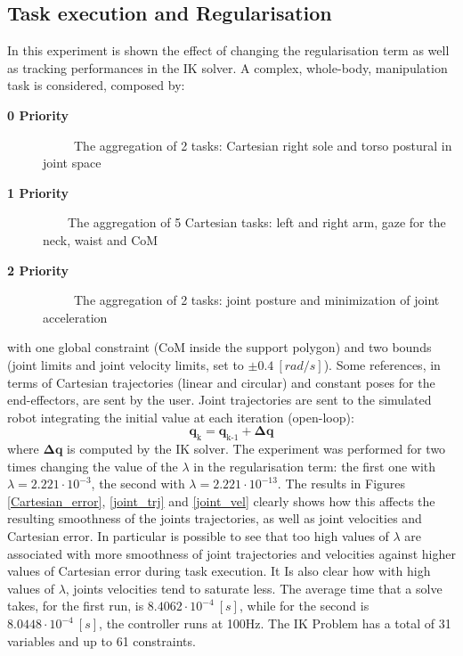 \subsection{Task execution and Regularisation}
In this experiment is shown the effect of changing the regularisation term as well as tracking performances in the IK solver. A complex, whole-body, manipulation task is considered, composed by:
\begin{description}
\item[\bf{0 Priority}] \ \ \ \ \ The aggregation of 2 tasks: Cartesian right sole and torso postural in joint space  
\item[\bf{1 Priority}] \ \ \ \ The aggregation of 5 Cartesian tasks: left and right arm, gaze for the neck, waist and CoM 
\item[\bf{2 Priority}] \ \ \ \ \ The aggregation of 2 tasks: joint posture and minimization of joint acceleration 
\end{description}
with one global constraint (CoM inside the support polygon) and two bounds (joint limits and joint velocity limits, set to $\pm 0.4 \ [rad/s]$). Some references, in terms of Cartesian trajectories (linear and circular) and constant poses for the end-effectors, are sent by the user. Joint trajectories are sent to the simulated robot integrating the initial value at each iteration (open-loop):
\begin{equation}
    \mathbf{q}_\text{k} = \mathbf{q}_\text{k-1} + \mathbf{\Delta q}
    \label{open_loop}
\end{equation}
where $\mathbf{\Delta q}$ is computed by the IK solver. The experiment was performed for two times changing the value of the $\lambda$ in the regularisation term: the first one with $\lambda = 2.221\cdot10^{-3}$, the second with $\lambda = 2.221\cdot10^{-13}$. The results in Figures \ref{Cartesian_error}, \ref{joint_trj} and \ref{joint_vel} clearly shows how this affects the resulting smoothness of the joints trajectories, as well as joint velocities and Cartesian error. In particular is possible to see that too high values of $\lambda$ are associated with more smoothness of joint trajectories and velocities against higher values of Cartesian error during task execution. It Is also clear how with high values of $\lambda$, joints velocities tend to saturate less. The average time that a solve takes, for the first run, is $8.4062 \cdot 10^{-4} \ [s]$, while for the second is $8.0448 \cdot 10^{-4} \ [s]$, the controller runs at 100Hz. The IK Problem has a total of 31 variables and up to 61 constraints.

